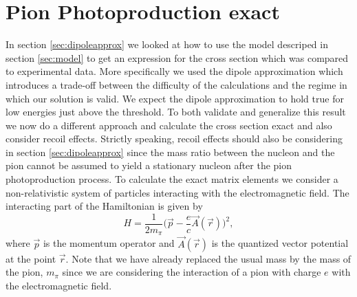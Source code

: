 \section{Pion Photoproduction exact}
In section \ref{sec:dipoleapprox} we looked at how to use the model descriped in section \ref{sec:model} to get an expression for the cross section which was compared to experimental data. More specifically we used the dipole approximation which introduces a trade-off between the difficulty of the calculations and the regime in which our solution is valid. We expect the dipole approximation to hold true for low energies just above the threshold. To both validate and generalize this result we now do a different approach and calculate the cross section exact and also consider recoil effects. Strictly speaking, recoil effects should also be considering in section \ref{sec:dipoleapprox} since the mass ratio between the nucleon and the pion cannot be assumed to yield a stationary nucleon after the pion photoproduction process. To calculate the exact matrix elements we consider a non-relativistic system of particles interacting with the electromagnetic field. The interacting part of the Hamiltonian is given by
\begin{equation} \label{firstinthamil}
    H = \frac{1}{2m_\pi} \bigg( \vec{p}-\frac{e}{c}\vec{A}(\vec{r}) \bigg)^2,
\end{equation}
where $\vec{p}$ is the momentum operator and $\vec{A}(\vec{r})$ is the quantized vector potential at the point $\vec{r}$. Note that we have already replaced the usual mass by the mass of the pion, $m_\pi$ since we are considering the interaction of a pion with charge $e$ with the electromagnetic field. 

